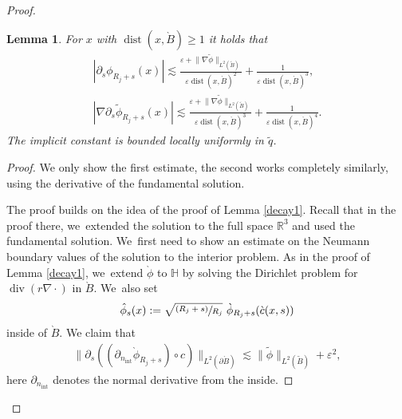 \documentclass[10pt]{amsart}
\let\epsilon\varepsilon
\newcommand{\psfrac}[2]{\sfrac{(#1)}{#2}}
\newtheorem{lemma}[theorem]{Lemma}
\theoremstyle{definition}
\renewcommand{\div}{\operatorname{div}}
\DeclareMathOperator{\dist}{dist}
\newcommand\R{\mathbb{R}}
\newcommand\anorm[1]{\lVert #1\rVert}
\newcommand\bnorm[1]{\bigl\lVert #1\bigr\rVert}
\let\de\partial
\let\eps\epsilon
\begin{document}
\begin{proof}
\begin{lemma}\label{Decay deri}
For $x$ with $\dist(x,\grave{B})\geq 1$ it holds that
\begin{align*}
|\de_s\phi_{R_j+s}(x)|\lesssim \frac{\eps+\anorm{\nabla\tilde{\phi}}_{L^2(\tilde{B})}}{\eps\dist(x,\grave{B})^2}+\frac{1}{\eps\dist(x,\grave{B})^3},
\\
\tag*{and}
|\nabla\de_s\tilde{\phi}_{R_j+s}(x)|\lesssim \frac{\eps+\anorm{\nabla\tilde{\phi}}_{L^2(\tilde{B})}}{\eps\dist(x,\grave{B})^3}+\frac{1}{\eps\dist(x,\grave{B})^4}.
\end{align*}
The implicit constant is bounded locally uniformly in $\tilde{q}$.

\end{lemma}
\begin{proof}
We only show the first estimate, the second works completely similarly, using the derivative of the fundamental solution.

The proof builds on the idea of the proof of Lemma \ref{decay1}. Recall that in the proof there, we~extended the solution to the full space $\R^3$ and used the fundamental solution. We~first need to show an estimate on the Neumann boundary values of the solution to the interior problem. As in the proof of Lemma \ref{decay1}, we~extend $\grave{\phi}$ to $\mathbb{H}$ by solving the Dirichlet problem for $\div(r\nabla\cdot)$ in $\grave{B}$. We~also set
\begin{align*}
\hat{\phi}_s(x):=\sqrt{\psfrac{R_j+s}{R_j}}\,\,\grave{\phi}_{R_j+s}(\grave{c}(x,s))
\end{align*}
inside of $\grave{B}$.
We claim that
\begin{align}
\bnorm{\de_s((\de_{n_\mathrm{int}}\grave{\phi}_{R_j+s})\circ c)}_{L^2(\de\grave{B})}\lesssim \bnorm{\tilde{\phi}}_{L^2(\tilde{B})}+\eps^2,\label{inner bd}
\end{align}
here $\de_{n_\mathrm{int}}$ denotes the normal derivative from the inside.


\end{proof}
\end{proof}
\end{document}
